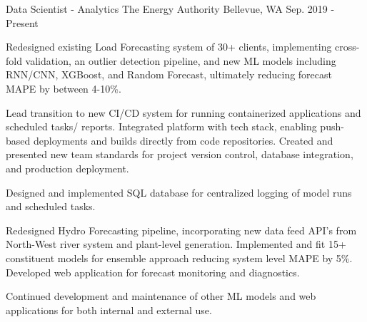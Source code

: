 

\begin{cventries}

  \cventry
    {Data Scientist - Analytics} %
    {The Energy Authority} %
    {Bellevue, WA} %
    {Sep. 2019 - Present} %
    {
      \begin{cvitems} %
        \item {Redesigned existing Load Forecasting system of 30+ clients, implementing cross-fold validation, an outlier detection pipeline, and new ML models including RNN/CNN, XGBoost, and Random Forecast, ultimately reducing forecast MAPE by between 4-10\%.}
        \item {Lead transition to new CI/CD system for running containerized applications and scheduled tasks/ reports. Integrated platform with tech stack, enabling push-based deployments and builds directly from code repositories. Created and presented new team standards for project version control, database integration, and production deployment.}
        \item {Designed and implemented SQL database for centralized logging of model runs and scheduled tasks.}
        \item {Redesigned Hydro Forecasting pipeline, incorporating new data feed API's from North-West river system and plant-level generation. Implemented and fit 15+ constituent models for ensemble approach reducing system level MAPE by 5\%. Developed web application for forecast monitoring and diagnostics.}
        \item {Continued development and maintenance of other ML models and web applications for both internal and external use.}
      \end{cvitems}
    }


\end{cventries}
